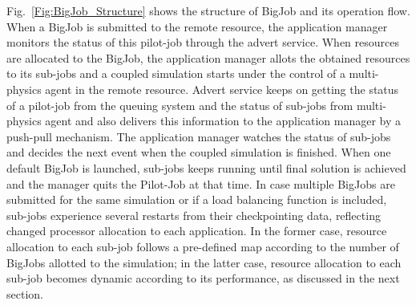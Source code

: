 \documentclass[conference,final]{IEEEtran}
\newcommand{\skonote}[1]{ {\textcolor{blue} { ***Jeff: #1 }}}
\newcommand{\skonote}[1]{}
\begin{document}


Fig.~\ref{Fig:BigJob_Structure} shows the structure of BigJob and its operation flow. When a BigJob is submitted to the remote resource, the application manager monitors the status of this pilot-job through the advert service. When resources are allocated to the BigJob, the application manager allots the obtained resources to its sub-jobs and a coupled simulation starts under the control of a multi-physics agent in the remote resource. Advert service keeps on getting the status of a pilot-job from the queuing system and the status of sub-jobs from multi-physics agent and also delivers this information to the application manager by a push-pull mechanism. The application manager watches the status of sub-jobs and decides the next event when the coupled simulation is finished. When one default BigJob is launched, sub-jobs keeps running until final solution is achieved and the manager quits the Pilot-Job at that time. In case multiple BigJobs are submitted for the same simulation or if a load balancing function is included, sub-jobs experience several restarts from their checkpointing data, reflecting changed processor allocation to each application. In the former case, resource allocation to each sub-job follows a pre-defined map according to the number of BigJobs allotted to the simulation; in the latter case, resource allocation to each sub-job becomes dynamic according to its performance, as discussed in the next section.
\end{document}
